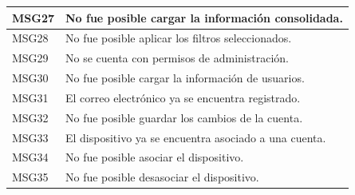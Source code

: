 \begin{longtable}{|p{2.5cm}|p{10.5cm}|}
MSG27 & No fue posible cargar la información consolidada. \\ \hline
MSG28 & No fue posible aplicar los filtros seleccionados. \\ \hline
MSG29 & No se cuenta con permisos de administración. \\ \hline
MSG30 & No fue posible cargar la información de usuarios. \\ \hline
MSG31 & El correo electrónico ya se encuentra registrado. \\ \hline
MSG32 & No fue posible guardar los cambios de la cuenta. \\ \hline
MSG33 & El dispositivo ya se encuentra asociado a una cuenta. \\ \hline
MSG34 & No fue posible asociar el dispositivo. \\ \hline
MSG35 & No fue posible desasociar el dispositivo. \\ \hline
\end{longtable}

